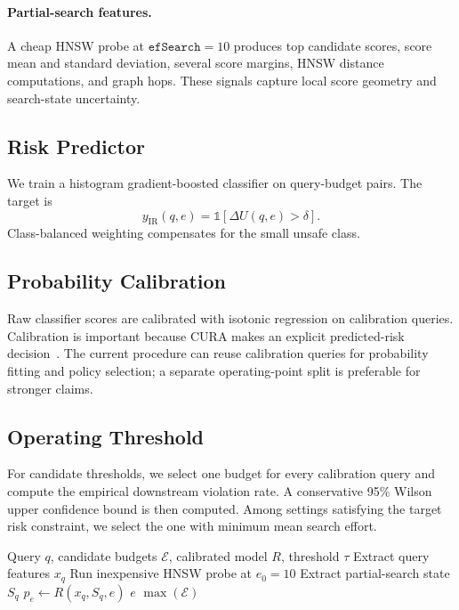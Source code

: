 \documentclass[10pt,twocolumn]{article}
\newcommand{\cura}{CURA}
\newcommand{\ef}{\texttt{efSearch}}
\begin{document}
\paragraph{Partial-search features.}
A cheap HNSW probe at $\ef=10$ produces top candidate scores, score mean and standard deviation, several score margins, HNSW distance computations, and graph hops. These signals capture local score geometry and search-state uncertainty.

\subsection{Risk Predictor}
We train a histogram gradient-boosted classifier on query-budget pairs. The target is
\[
y_{\mathrm{IR}}(q,e)=\mathbb{1}[\Delta U(q,e)>\delta].
\]
Class-balanced weighting compensates for the small unsafe class.

\subsection{Probability Calibration}
Raw classifier scores are calibrated with isotonic regression on calibration queries. Calibration is important because \cura{} makes an explicit predicted-risk decision~\citep{guo2017calibration}. The current procedure can reuse calibration queries for probability fitting and policy selection; a separate operating-point split is preferable for stronger claims.

\subsection{Operating Threshold}
For candidate thresholds, we select one budget for every calibration query and compute the empirical downstream violation rate. A conservative 95\% Wilson upper confidence bound is then computed. Among settings satisfying the target risk constraint, we select the one with minimum mean search effort.

\begin{algorithm}[!t]
\caption{\cura{} inference}
\label{alg:cura}
\begin{algorithmic}[1]
\Require Query $q$, candidate budgets $\mathcal E$, calibrated model $R$, threshold $\tau$
\State Extract query features $x_q$
\State Run inexpensive HNSW probe at $e_0=10$
\State Extract partial-search state $S_q$
\State $p_e\gets R(x_q,S_q,e)$
\State \Return $e$
\EndIf
\EndFor
\State \Return $\max(\mathcal E)$
\end{algorithmic}
\end{algorithm}
\end{document}
